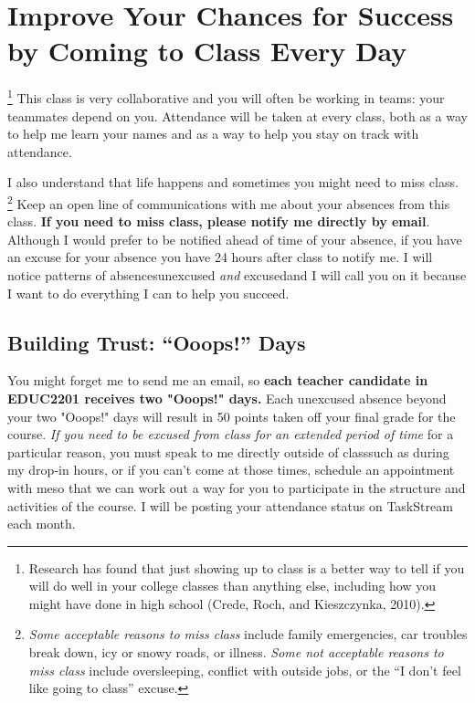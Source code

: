 \documentclass{tufte-handout}
\begin{document}
\section{Improve Your Chances for Success by Coming to Class Every Day}
\footnote{Research has found that just showing up to class is a better way to tell if you will do well in your college classes than anything else, including how you might have done in high school (Crede, Roch, and Kieszczynka, 2010).} This class is very collaborative and you will often be working in teams: your teammates depend on you. Attendance will be taken at every class, both as a way to help me learn your names and as a way to help you stay on track with attendance.

I also understand that life happens and sometimes you might need to miss class. \footnote{\textit{Some acceptable reasons to miss class} include family emergencies, car troubles break down, icy or snowy roads, or illness. \textit{Some not acceptable reasons to miss class} include oversleeping, conflict with outside jobs, or the \enquote{I don't feel like going to class} excuse.} Keep an open line of communications with me about your absences from this class. \textbf{If you need to miss class, please notify me directly by email}. Although I would prefer to be notified ahead of time of your absence, if you have an excuse for your absence you have 24 hours after class to notify me. I will notice patterns of absences\textemdash{}unexcused \emph{and} excused\textemdash{}and I will call you on it because I want to do everything I can to help you succeed.

\subsection{Building Trust: \enquote{Ooops!} Days}
You might forget me to send me an email, so \textbf{each teacher candidate in EDUC2201 receives two "Ooops!" days.} Each unexcused absence beyond your two "Ooops!" days will result in 50 points taken off your final grade for the course. \emph{If you need to be excused from class for an extended period of time} for a particular reason, you must speak to me directly outside of class\textemdash{}such as during my drop-in hours, or if you can't come at those times, schedule an appointment with me\textemdash{}so that we can work out a way for you to participate in the structure and activities of the course. I will be posting your attendance status on TaskStream each month.
\end{document}
